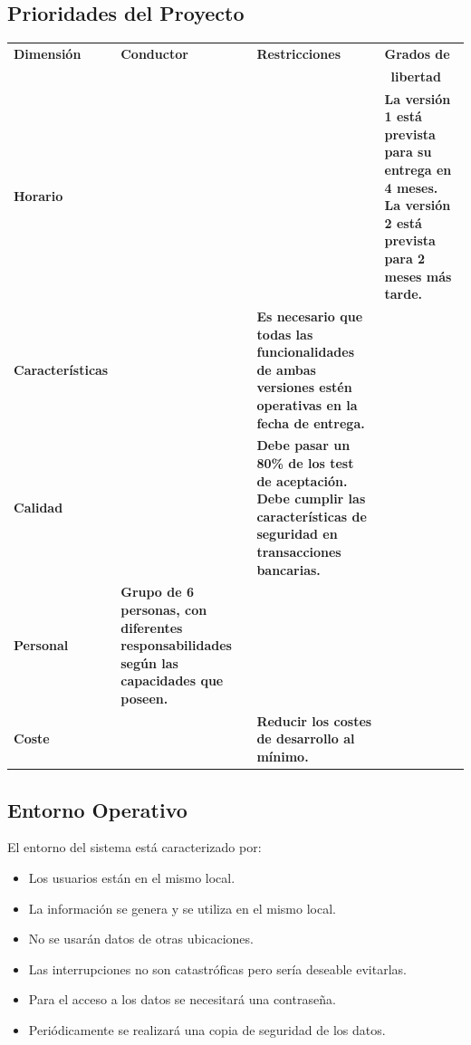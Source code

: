 \documentclass[a4paper,11pt]{article}
\begin{document}
		\subsection{Prioridades del Proyecto}
			\begin{center}
				\begin{tabular}{| l | p{2,7cm} | p{} | p{} |}
					\hline
					\cellcolor[RGB]{224,233,250}\textbf{Dimensión} & \cellcolor[RGB]{224,233,250}									\textbf{Conductor} & \cellcolor[RGB]{224,233,250}\textbf{Restricciones} & \cellcolor[RGB]								{224,233,250}\textbf{Grados de} \\
					\cellcolor[RGB]{224,233,250} & \cellcolor[RGB]{224,233,250} & \cellcolor[RGB]{224,233,250} & \							\cellcolor[RGB]{224,233,250}\textbf{libertad} \\
					\hline
					\textbf{Horario} &  & & \textbf{La versión 1 está prevista para su entrega en 4 meses. La versión 2 										está prevista para  2 meses más tarde.} \\
					\hline
					\textbf{Características} & & \textbf{Es necesario que todas las funcionalidades de ambas versiones 											estén operativas en la fecha de entrega.} & \\
					\hline
					\textbf{Calidad} & & \textbf{Debe pasar un 80\% de los test de aceptación. Debe cumplir las 												características de seguridad en transacciones bancarias.} &  \\
					\hline
					\textbf{Personal} & \textbf{Grupo de 6 personas, con diferentes responsabilidades según las 												capacidades que poseen.} &  & \\
					\hline
					\textbf{Coste} & & \textbf{Reducir los costes de desarrollo al mínimo.} & \\
					\hline
				\end{tabular}
			\end{center}
		\subsection{Entorno Operativo}
			El entorno del sistema está caracterizado por:
			\begin{itemize}
				\item Los usuarios están en el mismo local.
				\item La información se genera y se utiliza en el mismo local.
				\item No se usarán datos de otras ubicaciones.
				\item Las interrupciones no son catastróficas pero sería deseable evitarlas.
				\item Para el acceso a los datos se necesitará una contraseña.
				\item Periódicamente se realizará una copia de seguridad de los datos. 
			\end{itemize}
    \newpage
\end{document}
